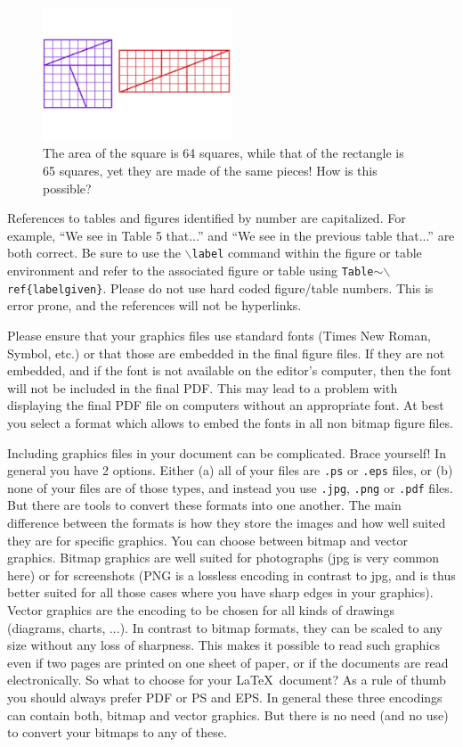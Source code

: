 \documentclass{wscpaperproc}
\theoremstyle{wsc}
\begin{document}
\begin{figure}[htb]
{
\centering
\includegraphics[width=0.50\textwidth]{puzzle}
\caption{The area of the square is 64 squares, while that of the rectangle is 65 squares, yet they are made of the same pieces! How
is this possible? \label{fig: rua}}
}
\end{figure}

References to tables and figures identified by number are capitalized. For example, ``We see in Table 5 that...'' and ``We see in the previous table that...'' are both correct. Be sure to use the {\tt $\backslash$label} command within the figure or table environment and refer to the associated figure or table using {\tt Table$\sim \backslash$ref\{labelgiven\}}.
Please do not use hard coded figure/table numbers. This is error prone, and the references will not be hyperlinks.

Please ensure that your graphics files use standard fonts (Times New Roman, Symbol, etc.) or that those are embedded in the final figure files.
If they are not embedded, and if the font is not available on the editor's computer, then the font will not be included in the final PDF.
This may lead to a problem with displaying the final PDF file on computers without an appropriate font.
At best you select a format which allows to embed the fonts in all non bitmap figure files.

Including graphics files in your document can be complicated. Brace yourself! In general you have 2 options. Either (a) all of your files are {\tt .ps} or {\tt .eps} files, or (b) none of your files are of those types, and instead you use {\tt .jpg}, {\tt .png} or {\tt .pdf} files.
But there are tools to convert these formats into one another. The main difference between the formats is how they store the images and how well suited they are for specific graphics. You can choose between bitmap and vector graphics.
Bitmap graphics are well suited for photographs (jpg is very common here) or for screenshots (PNG is a lossless encoding in contrast to jpg, and is thus better suited for all those cases where you have sharp edges in your graphics).
Vector graphics are the encoding to be chosen for all kinds of drawings (diagrams, charts, ...). In contrast to bitmap formats, they can be scaled to any size without any loss of sharpness. This makes it possible to read such graphics even if two pages are printed on one sheet of paper, or if the documents are read electronically.
So what to choose for your \LaTeX\ document? As a rule of thumb you should always prefer PDF or PS and EPS.
In general these three encodings can contain both, bitmap and vector graphics. But there is no need (and no use) to convert your bitmaps to any of these.
\end{document}
